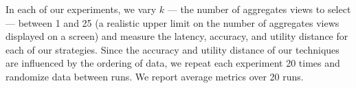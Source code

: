 In each of our experiments, we vary $k$ --- the number of aggregates views to select --- between
1 and 25 (a realistic upper limit on the number of aggregates views displayed on a screen)
and measure the latency, accuracy, and utility distance for each of our
strategies. 
Since the accuracy and utility distance of our techniques are influenced by the
ordering of data, we repeat each experiment 20
times and randomize data between runs. We report average
metrics over 20 runs.









